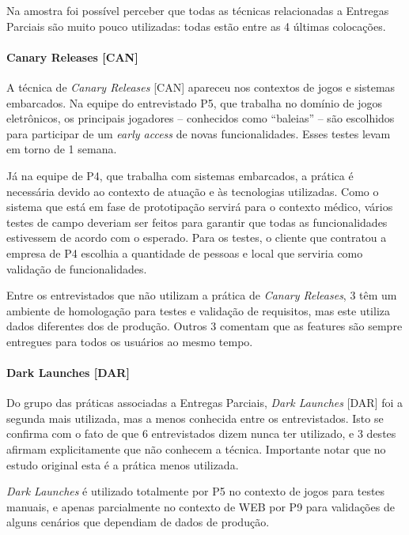 Na amostra foi possível perceber que todas as técnicas relacionadas a Entregas Parciais são muito pouco utilizadas: todas estão entre as 4 últimas colocações.

\paragraph{Canary Releases [CAN]}

A técnica de \emph{Canary Releases} [CAN] \cite{continuousDeliveryBook} apareceu nos contextos de jogos e sistemas embarcados. Na equipe do entrevistado P5, que trabalha no domínio de jogos eletrônicos, os principais jogadores -- conhecidos como ``baleias'' -- são escolhidos para participar de um \emph{early access} de novas funcionalidades.  Esses testes levam em torno de 1 semana. 

Já na equipe de P4, que trabalha com sistemas embarcados, a prática é necessária devido ao contexto de atuação e às tecnologias utilizadas. Como o sistema que está em fase de prototipação servirá para o contexto médico, vários testes de campo deveriam ser feitos para garantir que todas as funcionalidades estivessem de acordo com o esperado. Para os testes, o cliente que contratou a empresa de P4 escolhia a quantidade de pessoas e local que serviria como validação de funcionalidades.

Entre os entrevistados que não utilizam a prática de \emph{Canary Releases}, 3 têm um ambiente de homologação para testes e validação de requisitos, mas este utiliza dados diferentes dos de produção. Outros 3 comentam que as features são sempre entregues para todos os usuários ao mesmo tempo.


\paragraph{Dark Launches [DAR]}

Do grupo das práticas associadas a Entregas Parciais, \emph{Dark Launches} [DAR] \cite{devAndDeploymentFB} foi a segunda mais utilizada, mas a menos conhecida entre os entrevistados. Isto se confirma com o fato de que 6 entrevistados dizem nunca ter utilizado, e 3 destes afirmam explicitamente que não conhecem a técnica. Importante notar que no estudo original \cite{empiricalStudy2016} esta é a prática menos utilizada.

\emph{Dark Launches} é utilizado totalmente por P5 no contexto de jogos para testes manuais, e apenas parcialmente no contexto de WEB por P9 para validações de alguns cenários que dependiam de dados de produção.



